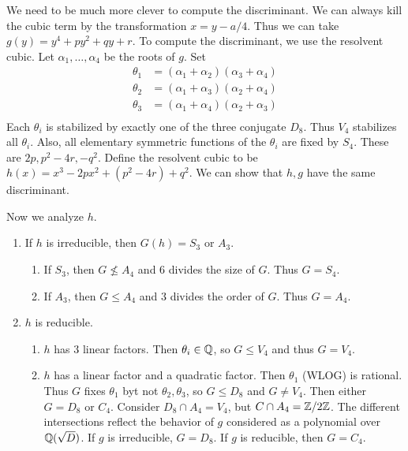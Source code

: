 \message{ !name(notes.tex)}\documentclass[10pt, twoside]{article}
\begin{document}
        We need to be much more clever to compute the discriminant. We can always kill the cubic term by the transformation $x = y-a/4$. Thus we can take $g(y) = y^4 + py^2 + qy + r$. To compute the discriminant, we use the resolvent cubic. Let $\alpha_1, \ldots, \alpha_4$ be the roots of $g$. Set
        \begin{align*}
            \theta_1 &= (\alpha_1 + \alpha_2)(\alpha_3 + \alpha_4) \\
            \theta_2 &= (\alpha_1 + \alpha_3)(\alpha_2 + \alpha_4) \\
            \theta_3 &= (\alpha_1 + \alpha_4)(\alpha_2 + \alpha_3) \\
        \end{align*}
        Each $\theta_i$ is stabilized by exactly one of the three conjugate $D_8$. Thus $V_4$ stabilizes all $\theta_i$. Also, all elementary symmetric functions of the $\theta_i$ are fixed by $S_4$. These are $2p, p^2-4r, -q^2$. Define the resolvent cubic to be $h(x) = x^3 - 2px^2 + (p^2-4r) + q^2$. We can show that $h,g$ have the same discriminant.

        Now we analyze $h$.
        \begin{enumerate}
            \item If $h$ is irreducible, then $G(h) = S_3$ or $A_3$.
            \begin{enumerate}[label=(\alph*)]
                \item If $S_3$, then $G \not\leq A_4$ and $6$ divides the size of $G$. Thus $G = S_4$.
                \item If $A_3$, then $G \leq A_4$ and $3$ divides the order of $G$. Thus $G = A_4$.
            \end{enumerate}
            \item $h$ is reducible.
                \begin{enumerate}
                    \item $h$ has $3$ linear factors. Then $\theta_i \in \mathbb{Q}$, so $G \leq V_4$ and thus $G = V_4$.
                    \item $h$ has a linear factor and a quadratic factor. Then $\theta_1$ (WLOG) is rational. Thus $G$ fixes $\theta_1$ byt not $\theta_2, \theta_3$, so $G \leq D_8$ and $G \neq V_4$. Then either $G = D_8$ or $C_4$. Consider $D_8 \cap A_4 = V_4$, but $C \cap A_4 = \mathbb{Z}/2\mathbb{Z}$. The different intersections reflect the behavior of $g$ considered as a polynomial over $\mathbb{Q}(\sqrt{D})$. If $g$ is irreducible, $G = D_8$. If $g$ is reducible, then $G = C_4$.
                \end{enumerate}
        \end{enumerate}
        
\end{document}

